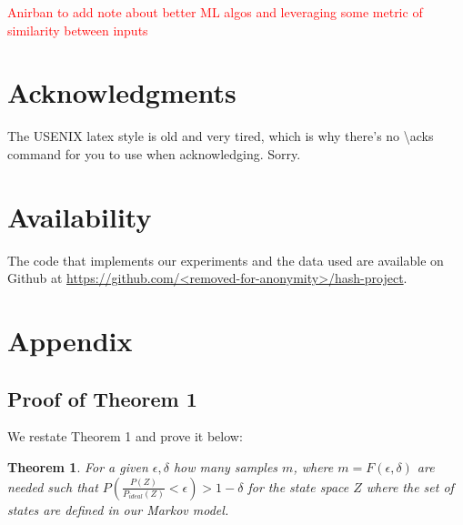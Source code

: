 \documentclass[letterpaper,twocolumn,10pt]{article}
\newtheorem{theorem}{Theorem}
\begin{document}
\textcolor{red}{Anirban to add note about better ML algos and leveraging some metric of similarity between inputs} 
\section*{Acknowledgments}

The USENIX latex style is old and very tired, which is why
there's no \textbackslash{}acks command for you to use when
acknowledging. Sorry.

\section*{Availability}

The code that implements our experiments and the data used are available on Github at \url{https://github.com/<removed-for-anonymity>/hash-project}. 

\section*{Appendix}
\subsection{Proof of Theorem 1}
We restate Theorem 1 and prove it below:

\begin{theorem}
\label{mainThm}
For a given $\epsilon, \delta$ how many samples $m$, where $m = F(\epsilon, \delta)$ are needed such that $P(\frac{P(Z)}{P_{ideal}(Z)}< \epsilon) > 1 - \delta$ for the state space $Z$ where the set of states are defined in our Markov model. 
\end{theorem}
\end{document}
